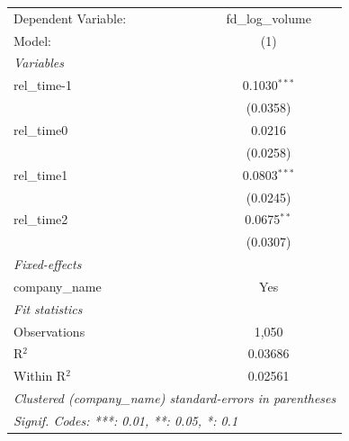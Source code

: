 
\begingroup
\centering
\begin{tabular}{lc}
   \tabularnewline \midrule \midrule
   Dependent Variable: & fd\_log\_volume\\    
   Model:              & (1)\\  
   \midrule
   \emph{Variables}\\
   rel\_time-1         & 0.1030$^{***}$\\   
                       & (0.0358)\\   
   rel\_time0          & 0.0216\\   
                       & (0.0258)\\   
   rel\_time1          & 0.0803$^{***}$\\   
                       & (0.0245)\\   
   rel\_time2          & 0.0675$^{**}$\\   
                       & (0.0307)\\   
   \midrule
   \emph{Fixed-effects}\\
   company\_name       & Yes\\  
   \midrule
   \emph{Fit statistics}\\
   Observations        & 1,050\\  
   R$^2$               & 0.03686\\  
   Within R$^2$        & 0.02561\\  
   \midrule \midrule
   \multicolumn{2}{l}{\emph{Clustered (company\_name) standard-errors in parentheses}}\\
   \multicolumn{2}{l}{\emph{Signif. Codes: ***: 0.01, **: 0.05, *: 0.1}}\\
\end{tabular}
\par\endgroup


